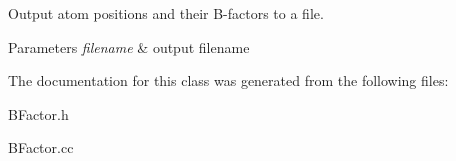 Output atom positions and their B-\/factors to a file. 


\begin{DoxyParams}{Parameters}
{\em filename} & output filename \\
\hline
\end{DoxyParams}


The documentation for this class was generated from the following files\-:\begin{DoxyCompactItemize}
\item 
B\-Factor.\-h\item 
B\-Factor.\-cc\end{DoxyCompactItemize}
